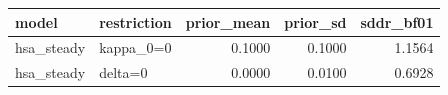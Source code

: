 \begin{tabular}{llrrr}
\toprule
model & restriction & prior\_mean & prior\_sd & sddr\_bf01 \\
\midrule
hsa\_steady & kappa\_0=0 & 0.1000 & 0.1000 & 1.1564 \\
hsa\_steady & delta=0 & 0.0000 & 0.0100 & 0.6928 \\
\bottomrule
\end{tabular}
